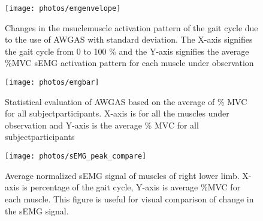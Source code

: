 \documentclass[paper,JRM,paper]{jaciiiarticle}
\begin{document}
\begin{figure*}
	\centering
	\texttt{[image: photos/emgenvelope]}
	\caption{Changes in the msuclemuscle activation pattern of the gait cycle due to the use of AWGAS with standard deviation. The X-axis signifies the gait cycle from 0 to 100 \% and the Y-axis signifies the average \%MVC sEMG activation pattern for each muscle under observation}
	\label{fig:emgenvelope}
\end{figure*}
\begin{figure*}
	\centering
	\texttt{[image: photos/emgbar]}
	\caption{Statistical evaluation of AWGAS based on the average of \% MVC for all subjectparticipants. X-axis is for all the muscles under observation and Y-axis is the average \% MVC for all subjectparticipants}
	\label{fig:awgasemgbarpvalue}
\end{figure*}
\begin{figure}
	\centering
	\texttt{[image: photos/sEMG\_peak\_compare]}
	\caption{Average normalized sEMG signal of muscles of right lower limb. X-axis is percentage of the gait cycle, Y-axis is average \%MVC for each muscle. This figure is useful for visual comparison of change in the sEMG signal.}
	\label{fig:semgpeakcompare}
\end{figure}
\end{document}
